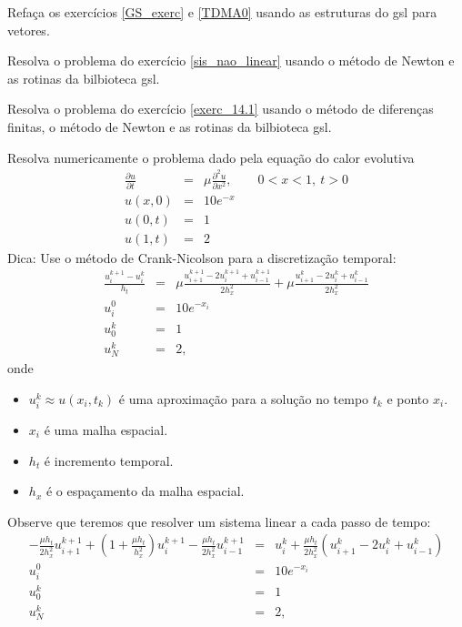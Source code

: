 \begin{exer}
Refaça os exercícios \ref{GS_exerc} e \ref{TDMA0} usando as estruturas do gsl para vetores.
\end{exer}

\begin{exer}Resolva o problema do exercício \ref{sis_nao_linear} usando o método de Newton e as rotinas da bilbioteca gsl.
\end{exer}
\begin{exer}
Resolva o problema do exercício \ref{exerc_14.1} usando o método de diferenças finitas, o método de Newton e as rotinas da bilbioteca gsl.
\end{exer}
\begin{exer}
Resolva numericamente o problema dado pela equação do calor evolutiva
\begin{eqnarray*}
\frac{\partial u}{\partial t}&=&\mu\frac{\partial^2 u}{\partial x^2},\qquad 0<x<1,\ t>0\\
u(x,0)&=&10e^{-x}\\
u(0,t)&=&1\\
u(1,t)&=&2
\end{eqnarray*}
Dica: Use o método de Crank-Nicolson para a discretização temporal:
\begin{eqnarray*}
\frac{u^{k+1}_i-u^{k}_i}{h_t}&=&\mu\frac{u^{k+1}_{i+1}-2u^{k+1}_i+u^{k+1}_{i-1}}{2h_x^2}+\mu\frac{u^{k}_{i+1}-2u^{k}_i+u^{k}_{i-1}}{2h_x^2}\\
u_i^0&=&10e^{-x_i}\\
u_0^{k}&=&1\\
u_N^{k}&=&2,
\end{eqnarray*}
onde
\begin{itemize}
 \item $u^k_i\approx u(x_i,t_k)$ é uma aproximação para a solução no tempo $t_k$ e ponto $x_i$.
 \item $x_i$ é uma malha espacial.
 \item $h_t$ é incremento temporal.
 \item $h_x$ é o espaçamento da malha espacial.
\end{itemize}
Observe que teremos que resolver um sistema linear a cada passo de tempo:
\begin{eqnarray*}
-\frac{\mu h_t}{2h_x^2}u^{k+1}_{i+1}+\left(1+\frac{\mu h_t}{h_x^2}\right)u^{k+1}_i-\frac{\mu h_t}{2h_x^2}u^{k+1}_{i-1}&=&u^{k}_i+\frac{\mu h_t}{2h_x^2}\left(u^{k}_{i+1}-2u^{k}_i+u^{k}_{i-1}\right)\\
u_i^0&=&10e^{-x_i}\\
u_0^{k}&=&1\\
u_N^{k}&=&2,
\end{eqnarray*}
\end{exer}
